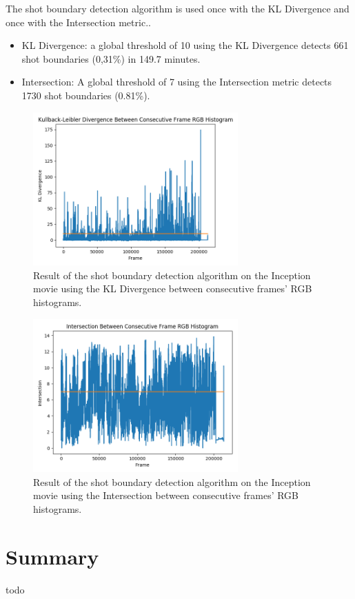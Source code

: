 The shot boundary detection algorithm is used once with the KL Divergence and once with the Intersection metric..

\begin{itemize}
    \item KL Divergence: a global threshold of 10 using the KL Divergence detects 661 shot boundaries (0,31\%) in 149.7 minutes.
    \item Intersection: A global threshold of 7 using the Intersection metric detects 1730 shot boundaries (0.81\%).
\end{itemize}

\begin{figure}[h] 
\centerline{\includegraphics[width=0.70\textwidth]{figures/evaluation/inception_KLdiv_threshold10.png}}
\caption{\label{fig:inception_KLdiv_threshold10}Result of the shot boundary detection algorithm on the Inception movie using the KL Divergence between consecutive frames' RGB histograms.}
\end{figure}

\begin{figure}[h] 
\centerline{\includegraphics[width=0.70\textwidth]{figures/evaluation/inception_inter_threshold7.png}}
\caption{\label{fig:inception_inter_threshold7}Result of the shot boundary detection algorithm on the Inception movie using the Intersection between consecutive frames' RGB histograms.}
\end{figure}


\section{Summary}

todo